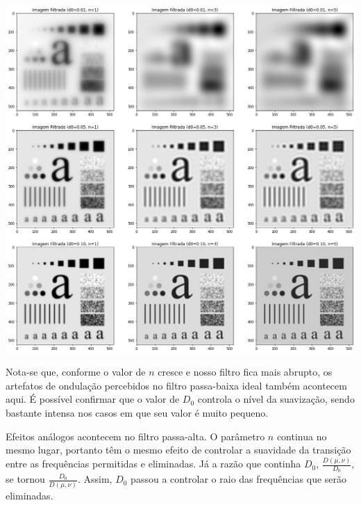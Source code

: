 \documentclass[12pt,a4paper]{article}
\begin{document}
\vspace{1em}
\begin{center}
	\includegraphics[width=\textwidth]{imagens_low_pass}
\end{center}
\vspace{1em}

Nota-se que, conforme o valor de $n$ cresce e nosso filtro fica mais abrupto, os artefatos de ondulação percebidos no filtro passa-baixa ideal também acontecem aqui. É possível confirmar que o valor de $D_0$ controla o nível da suavização, sendo bastante intensa nos casos em que seu valor é muito pequeno.

Efeitos análogos acontecem no filtro passa-alta. O parâmetro $n$ continua no mesmo lugar, portanto têm o mesmo efeito de controlar a suavidade da transição entre as frequências permitidas e eliminadas. Já a razão que continha $D_0$, $\frac{D(\mu,\nu)}{D_0}$, se tornou $\frac{D_0}{D(\mu,\nu)}$. Assim, $D_0$ passou a controlar o raio das frequências que serão eliminadas.
\end{document}

